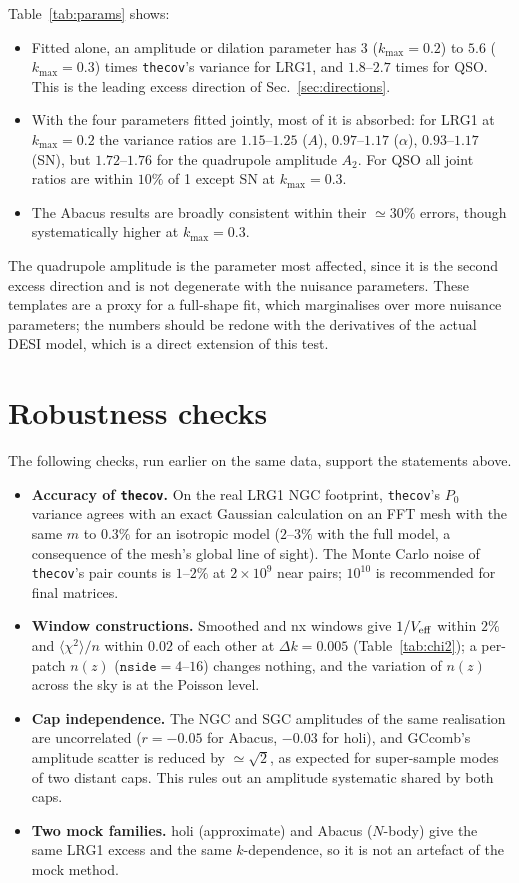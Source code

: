 \documentclass[11pt]{article}
\newcommand{\thecov}{\texttt{thecov}}
\begin{document}
Table~\ref{tab:params} shows:
\begin{itemize}
\item Fitted alone, an amplitude or dilation parameter has $3$ ($k_{\max}=0.2$) to $5.6$ ($k_{\max}=0.3$) times \thecov's variance for LRG1, and $1.8$--$2.7$ times for QSO. This is the leading excess direction of Sec.~\ref{sec:directions}.
\item With the four parameters fitted jointly, most of it is absorbed: for LRG1 at $k_{\max}=0.2$ the variance ratios are $1.15$--$1.25$ ($A$), $0.97$--$1.17$ ($\alpha$), $0.93$--$1.17$ (SN), but $1.72$--$1.76$ for the quadrupole amplitude $A_2$. For QSO all joint ratios are within $10\%$ of 1 except SN at $k_{\max}=0.3$.
\item The Abacus results are broadly consistent within their $\simeq30\%$ errors, though systematically higher at $k_{\max}=0.3$.
\end{itemize}
The quadrupole amplitude is the parameter most affected, since it is the second excess direction and is not degenerate with the nuisance parameters. These templates are a proxy for a full-shape fit, which marginalises over more nuisance parameters; the numbers should be redone with the derivatives of the actual DESI model, which is a direct extension of this test.

\section{Robustness checks}
\label{sec:robust}

The following checks, run earlier on the same data, support the statements above.
\begin{itemize}
\item \textbf{Accuracy of \thecov.} On the real LRG1 NGC footprint, \thecov's $P_0$ variance agrees with an exact Gaussian calculation on an FFT mesh with the same $m$ to $0.3\%$ for an isotropic model ($2$--$3\%$ with the full model, a consequence of the mesh's global line of sight). The Monte Carlo noise of \thecov's pair counts is $1$--$2\%$ at $2\times10^9$ near pairs; $10^{10}$ is recommended for final matrices.
\item \textbf{Window constructions.} Smoothed and nx windows give $1/V_{\rm eff}$ within $2\%$ and $\langle\chi^2\rangle/n$ within $0.02$ of each other at $\Delta k=0.005$ (Table~\ref{tab:chi2}); a per-patch $n(z)$ ($\texttt{nside}=4$--$16$) changes nothing, and the variation of $n(z)$ across the sky is at the Poisson level.
\item \textbf{Cap independence.} The NGC and SGC amplitudes of the same realisation are uncorrelated ($r=-0.05$ for Abacus, $-0.03$ for holi), and GCcomb's amplitude scatter is reduced by $\simeq\sqrt2$, as expected for super-sample modes of two distant caps. This rules out an amplitude systematic shared by both caps.
\item \textbf{Two mock families.} holi (approximate) and Abacus ($N$-body) give the same LRG1 excess and the same $k$-dependence, so it is not an artefact of the mock method.
\end{itemize}
\end{document}
